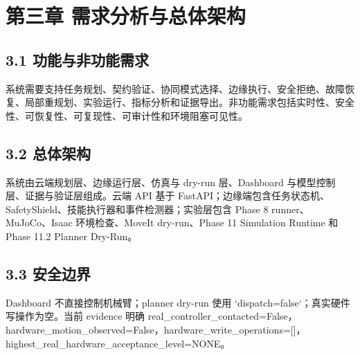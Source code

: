 \chapter{第三章 需求分析与总体架构}

\section{3.1 功能与非功能需求}

系统需要支持任务规划、契约验证、协同模式选择、边缘执行、安全拒绝、故障恢复、局部重规划、实验运行、指标分析和证据导出。非功能需求包括实时性、安全性、可恢复性、可复现性、可审计性和环境阻塞可见性。\par

\section{3.2 总体架构}

系统由云端规划层、边缘运行层、仿真与 dry-run 层、Dashboard 与模型控制层、证据与验证层组成。云端 API 基于 FastAPI；边缘端包含任务状态机、SafetyShield、技能执行器和事件检测器；实验层包含 Phase 8 runner、MuJoCo、Isaac 环境检查、MoveIt dry-run、Phase 11 Simulation Runtime 和 Phase 11.2 Planner Dry-Run。\par

\section{3.3 安全边界}

Dashboard 不直接控制机械臂；planner dry-run 使用 `dispatch=false`；真实硬件写操作为空。当前 evidence 明确 real\_controller\_contacted=False，hardware\_motion\_observed=False，hardware\_write\_operations=[]，highest\_real\_hardware\_acceptance\_level=NONE。\par
